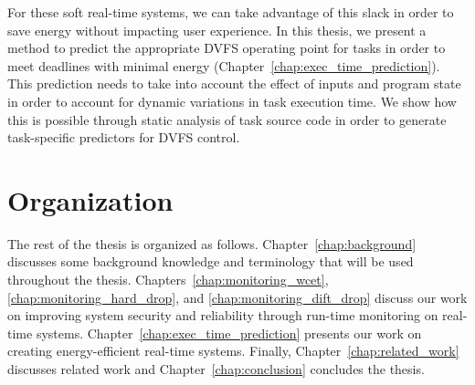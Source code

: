 For these soft real-time systems, we can take advantage of this slack in order
to save energy without impacting user experience. In this thesis, we present a
method to predict the appropriate DVFS operating point for tasks in order to
meet deadlines with minimal energy (Chapter~\ref{chap:exec_time_prediction}).
This prediction needs to take into account the effect of inputs and program
state in order to account for dynamic variations in task execution time. We
show how this is possible through static analysis of task source code in order
to generate task-specific predictors for DVFS control.

\section{Organization}
The rest of the thesis is organized as follows.
Chapter~\ref{chap:background} discusses some background knowledge and
terminology that will be used throughout the thesis.
Chapters~\ref{chap:monitoring_wcet}, \ref{chap:monitoring_hard_drop}, and
\ref{chap:monitoring_dift_drop} discuss our work on improving system security
and reliability through run-time monitoring on real-time systems. 
Chapter~\ref{chap:exec_time_prediction} presents our work on creating
energy-efficient real-time systems. Finally, Chapter~\ref{chap:related_work}
discusses related work and Chapter~\ref{chap:conclusion} concludes the thesis.

